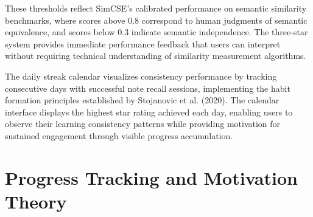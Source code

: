 {{These thresholds reflect SimCSE's calibrated performance on semantic similarity benchmarks, where scores above 0.8 correspond to human judgments of semantic equivalence, and scores below 0.3 indicate semantic independence. The three-star system provides immediate performance feedback that users can interpret without requiring technical understanding of similarity measurement algorithms.

The daily streak calendar visualizes consistency performance by tracking consecutive days with successful note recall sessions, implementing the habit formation principles established by Stojanovic et al. (2020). The calendar interface displays the highest star rating achieved each day, enabling users to observe their learning consistency patterns while providing motivation for sustained engagement through visible progress accumulation.
}
}





\section{Progress Tracking and Motivation Theory}

